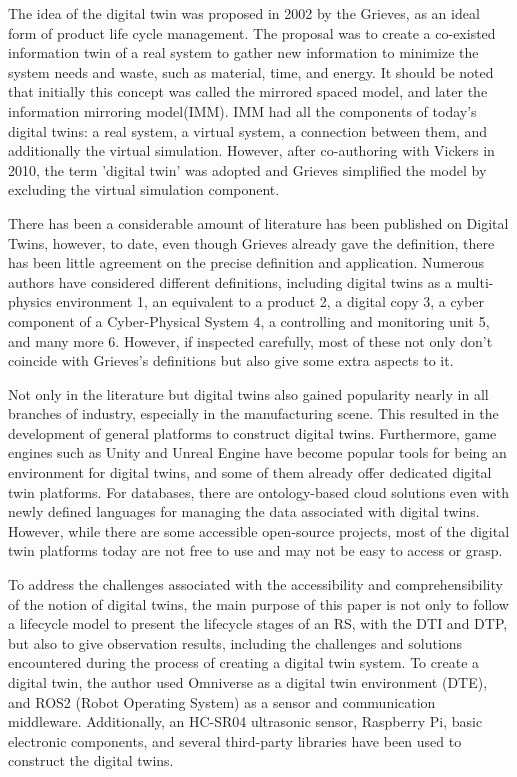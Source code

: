 \documentclass[conference]{IEEEtran}
\begin{document}
    The idea of the digital twin was proposed in 2002 by the Grieves,
    as an ideal form of product life cycle management.
    The proposal was to create a co-existed information twin of a real system to gather new information to minimize the system needs and waste,
    such as material, time, and energy. It should be noted that initially this concept was called the mirrored spaced model, and later the information mirroring model(IMM).
    IMM had all the components of today's digital twins: a real system, a virtual system,  a connection between them, and additionally the virtual simulation. 
    However, after co-authoring with Vickers in 2010, the term 'digital twin' was adopted and Grieves simplified the model by excluding the virtual simulation component.
    
    There has been a considerable amount of literature has been published on Digital Twins, 
    however, to date, even though Grieves already gave the definition, there has been little agreement on the precise definition and application. 
    Numerous authors have considered different definitions, including digital twins as a multi-physics environment 1, an equivalent to a product 2, 
    a digital copy 3, a cyber component of a Cyber-Physical System 4, a controlling and monitoring unit 5, and many more 6. However, if inspected carefully, 
    most of these not only don't coincide with Grieves's definitions but also give some extra aspects to it. 

    Not only in the literature but digital twins also gained popularity nearly in all branches of industry,
    especially in the manufacturing scene.  This resulted in the development of general platforms to construct digital twins. 
    Furthermore, game engines such as Unity and  Unreal Engine have become popular tools for being an environment for digital twins, 
    and some of them already offer dedicated digital twin platforms. For databases, there are ontology-based cloud solutions even with newly defined 
    languages for managing the data associated with digital twins. However, while there are some accessible open-source projects, most of the digital 
    twin platforms today are not free to use and may not be easy to access or grasp. 

    To address the challenges associated with the accessibility and comprehensibility of the notion of digital twins,
    the main purpose of this paper is not only to follow a lifecycle model to present the lifecycle stages of an RS, with the DTI and DTP,
    but also to give observation results, including the challenges and solutions encountered during the process of creating a digital twin system.
    To create a digital twin, the author used Omniverse as a digital twin environment (DTE), and ROS2 (Robot Operating System) as a sensor and communication middleware.
    Additionally, an HC-SR04 ultrasonic sensor, Raspberry Pi, basic electronic components, and several third-party libraries have been used to construct the digital twins. 
\end{document}
